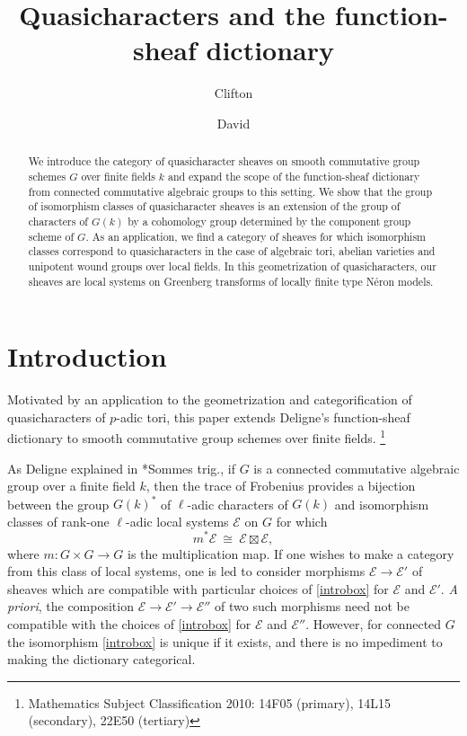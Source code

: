 \documentclass[CM,Submssn,SecEq]{degruyter-crelle} %
\title{Quasicharacters and the function-sheaf dictionary}
\author{Clifton}{Cunningham}{C.~Cunningham}{Calgary}
\author{David}{Roe}{D.~Roe}{Calgary}
\theoremstyle{plain}
\theoremstyle{definition}
\theoremstyle{remark}
\newcommand{\Fq}{k}
\newcommand{\iso}{{\ \cong\ }}
\newcommand{\qcs}[1]{{\mathcal{#1}}}
\begin{document}
\begin{abstract}
We introduce the category of quasicharacter sheaves on smooth commutative group schemes $G$ over finite fields $k$ and expand the scope of the function-sheaf dictionary from connected commutative algebraic groups to this setting.
We show that the group of isomorphism classes of quasicharacter sheaves is an extension of the group of characters of $G(k)$ by a cohomology group determined by the component group scheme of $G$.
As an application, we find a category of sheaves for which isomorphism classes correspond to quasi\-characters in the case of algebraic tori, abelian varieties and unipotent wound groups over local fields. 
In this geometrization of quasicharacters, our sheaves are local systems on
Greenberg transforms of locally finite type N\'eron models.
\end{abstract}



\section*{Introduction}


Motivated by an application to the geometrization and categorification of quasicharacters of $p$-adic tori,
this paper extends Deligne's function-sheaf dictionary to smooth commutative group schemes over finite fields. 
\footnote{Mathematics Subject Classification 2010: 14F05 (primary), 14L15 (secondary), 22E50 (tertiary)}

As Deligne explained in \cite{deligne:SGA4.5}*{Sommes trig.}, if $G$ is a connected commutative algebraic group over a finite field $k$, then the trace of Frobenius provides a bijection between the group $G(\Fq)^*$ of $\ell$-adic characters of $G(\Fq)$ and isomorphism classes of rank-one $\ell$-adic local systems $\mathcal{E}$ on $G$ for which 
\begin{equation}\label{introbox}
m^* \qcs{E} \iso \qcs{E} \boxtimes \qcs{E},%
\end{equation}
where $m : G\times G\to G$ is the multiplication map.
%
If one wishes to make a category from this class of local systems, one is led to consider morphisms $\qcs{E} \to \qcs{E}'$ of sheaves which are compatible with particular choices of \eqref{introbox} for $\qcs{E}$ and $\qcs{E'}$. 
{\it A priori}, the composition $\qcs{E} \to \qcs{E}' \to \qcs{E}''$ of two such morphisms need not be compatible with the choices of \eqref{introbox} for $\qcs{E}$ and $\qcs{E}''$. %
 However, for connected $G$ the isomorphism \eqref{introbox} is unique if it exists, and there is no impediment to making the dictionary categorical.
\end{document}
